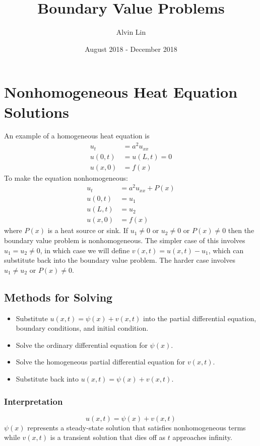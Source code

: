 \documentclass{math}
\title{Boundary Value Problems}
\author{Alvin Lin}
\date{August 2018 - December 2018}
\begin{document}
\maketitle

\section*{Nonhomogeneous Heat Equation Solutions}
An example of a homogeneous heat equation is
\begin{align*}
  u_t &= a^2u_{xx} \\
  u(0,t) &= u(L,t) = 0 \\
  u(x,0) &= f(x)
\end{align*}
To make the equation nonhomogeneous:
\begin{align*}
  u_t &= a^2u_{xx}+P(x) \\
  u(0,t) &= u_1 \\
  u(L,t) &= u_2 \\
  u(x,0) &= f(x)
\end{align*}
where \( P(x) \) is a heat source or sink. If \( u_1 \ne 0 \) or
\( u_2 \ne 0 \) or \( P(x)\ne0 \) then the boundary value problem is
nonhomogeneous. The simpler case of this involves \( u_1 = u_2 \ne 0 \),
in which case we will define \( v(x,t) = u(x,t)-u_1 \), which can substitute
back into the boundary value problem. The harder case involves \( u_1 \ne u_2 \)
or \( P(x) \ne 0 \).

\subsection*{Methods for Solving}
\begin{itemize}
  \item Substitute \( u(x,t) = \psi(x)+v(x,t) \) into the partial differential
    equation, boundary conditions, and initial condition.
  \item Solve the ordinary differential equation for \( \psi(x) \).
  \item Solve the homogeneous partial differential equation for \( v(x,t) \).
  \item Substitute back into \( u(x,t) = \psi(x)+v(x,t) \).
\end{itemize}

\subsubsection*{Interpretation}
\[ u(x,t) = \psi(x)+v(x,t) \]
\( \psi(x) \) represents a steady-state solution that satisfies nonhomogeneous
terms while \( v(x,t) \) is a transient solution that dies off as \( t \)
approaches infinity.
\end{document}
